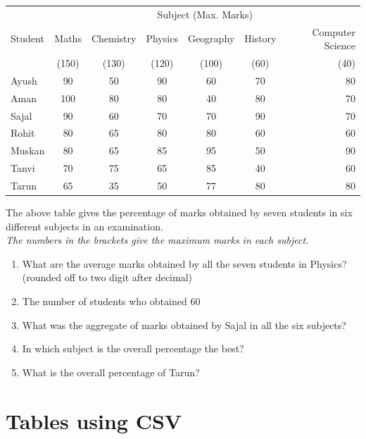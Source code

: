 \documentclass[a4paper]{article}
\begin{document}
\begin{table}[h]
\begin{tabular}{|l|c|c|c|c|c|r|}
\hline
	& \multicolumn{6}{c}{Subject (Max. Marks)} \\
 Student & Maths	 & Chemistry	 & Physics & Geography & History & Computer Science \\

& (150) & (130) & (120) & (100) & (60) & (40) \\
\hline
Ayush	& 90 &	50	& 90	 & 60 & 70  &	80 \\
Aman	 & 100	& 80	 & 80	& 40	 & 80 &	70 \\
Sajal	& 90 &	60 & 	70 & 	70	& 90	 & 70 \\
Rohit	& 80 & 	65 & 	80	& 80	 & 60 &	60 \\
Muskan	& 80 &	65	& 85	 & 95	& 50	 & 90 \\
Tanvi	& 70	 & 75	& 65	 & 85	& 40 &	60 \\
Tarun	& 65 &	35	& 50	 & 77	& 80	 & 80 \\
\hline
\end{tabular}
\end{table}
\noindent \cite{float} The above table gives the percentage of marks obtained by seven students in six different subjects in an examination. \\ 
\textit{The numbers in the brackets give the maximum marks in each subject.}

\begin{enumerate}
\item What are the average marks obtained by all the seven students in Physics? (rounded off to two digit after decimal)
\item The number of students who obtained 60%
\item What was the aggregate of marks obtained by Sajal in all the six subjects?
\item In which subject is the overall percentage the best?
\item What is the overall percentage of Tarun?
\end{enumerate}
\pagebreak
\section{Tables using CSV}
\end{document}
